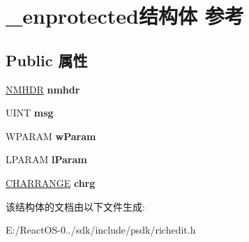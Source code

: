 \hypertarget{struct__enprotected}{}\section{\+\_\+enprotected结构体 参考}
\label{struct__enprotected}
\subsection*{Public 属性}
\begin{DoxyCompactItemize}
\item 
\mbox{\label{struct__enprotected_af0c1570f03e41936af2a2a20047167c2}} 
\hyperlink{structtag_n_m_h_d_r}{N\+M\+H\+DR} {\bfseries nmhdr}
\item 
\mbox{\label{struct__enprotected_a418bed7900435ec5f359d93a10f7a293}} 
U\+I\+NT {\bfseries msg}
\item 
\mbox{\label{struct__enprotected_a9aa046ba94a09013606360565b3bfad1}} 
W\+P\+A\+R\+AM {\bfseries w\+Param}
\item 
\mbox{\label{struct__enprotected_a0547c79ee2b7e05344b6d19a1ea1641d}} 
L\+P\+A\+R\+AM {\bfseries l\+Param}
\item 
\mbox{\label{struct__enprotected_adf7e97cd9004adc07ca289bf5dd4d025}} 
\hyperlink{struct__charrange}{C\+H\+A\+R\+R\+A\+N\+GE} {\bfseries chrg}
\end{DoxyCompactItemize}


该结构体的文档由以下文件生成\+:\begin{DoxyCompactItemize}
\item 
E\+:/\+React\+O\+S-\/0../sdk/include/psdk/richedit.\+h\end{DoxyCompactItemize}
